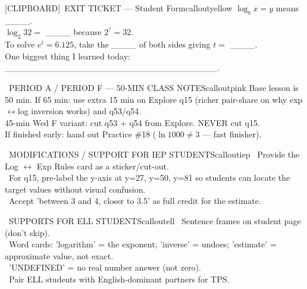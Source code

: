 \documentclass[11pt]{article}
\newcommand{\IconClipboard}{[CLIPBOARD]}
\begin{document}
\begin{callout}{\IconClipboard\ EXIT TICKET --- Student Form}{calloutyellow}
\(\log_b x = y\) means \_\_\_\_.\\
\(\log_2 32 =\) \_\_\_\_ because \(2^{?} = 32\).\\
To solve \(e^t = 6.125\), take the \_\_\_\_ of both sides giving \(t =\) \_\_\_\_.\\
One biggest thing I learned today: \_\_\_\_\_\_\_\_\_\_\_\_\_\_\_\_\_\_\_\_\_\_\_\_\_\_\_\_\_\_\_\_\_\_.
\end{callout}

\clearpage

\begin{callout}{\IconClock\ PERIOD A / PERIOD F --- 50-MIN CLASS NOTES}{calloutpink}
Base lesson is 50 min. If 65 min: use extra 15 min on Explore q15 (richer pair-share on why exp\(\leftrightarrow\)log inversion works) and q53/q54.\\
45-min Wed F variant: cut q53 + q54 from Explore. NEVER cut q15.\\
If finished early: hand out Practice \#18 (\(\ln 1000 \neq 3\) --- fast finisher).
\end{callout}

\begin{callout}{\IconPuzzle\ MODIFICATIONS / SUPPORT FOR IEP STUDENTS}{calloutiep}
\textbullet\ Provide the Log \(\leftrightarrow\) Exp Rules card as a sticker/cut-out.\\
\textbullet\ For q15, pre-label the y-axis at y=27, y=50, y=81 so students can locate the target values without visual confusion.\\
\textbullet\ Accept 'between 3 and 4, closer to 3.5' as full credit for the estimate.
\end{callout}

\begin{callout}{\IconGlobe\ SUPPORTS FOR ELL STUDENTS}{calloutell}
\textbullet\ Sentence frames on student page (don't skip).\\
\textbullet\ Word cards: 'logarithm' = the exponent; 'inverse' = undoes; 'estimate' = approximate value, not exact.\\
\textbullet\ 'UNDEFINED' = no real number answer (not zero).\\
\textbullet\ Pair ELL students with English-dominant partners for TPS.
\end{callout}
\end{document}
